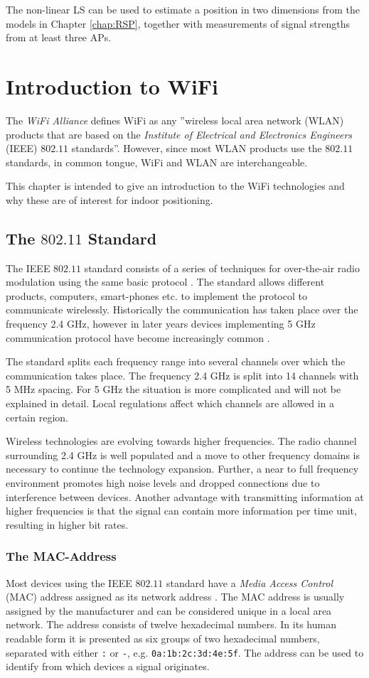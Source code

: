 \documentclass{LTHthesis}
\begin{document}
The non-linear LS can be used to estimate a position in two dimensions from the models in Chapter \ref{chap:RSP}, together with measurements of signal
 strengths from at least three APs. 
%
\chapter{Introduction to WiFi} %
\label{chap:wifi}
The \emph{WiFi Alliance} defines WiFi as any ''wireless local area network (WLAN) products that are based on the \emph{Institute of Electrical and Electronics Engineers} (IEEE) $802.11$ standards''. However, since most WLAN products use the $802.11$ standards, in common tongue, WiFi and WLAN are interchangeable.    

This chapter is intended to give an introduction to the WiFi technologies and why these are of interest for indoor positioning.
%
\section{The $802.11$ Standard}
%
The IEEE $802.11$ standard consists of a series of techniques for over-the-air radio modulation using the same basic protocol \cite{IEEE:802.11}. The standard allows different products, computers, smart-phones etc. to implement the protocol to communicate wirelessly. Historically the communication has taken place over the frequency 2.4 GHz, however in later years devices implementing 5 GHz communication protocol have become increasingly common \cite{walrand10}.

The standard splits each frequency range into several channels over which the communication takes place. The frequency 2.4 GHz is split into 14 channels with 5 MHz spacing. For 5 GHz the situation is more complicated and will not be explained in detail. Local regulations affect which channels are allowed in a certain region.   

Wireless technologies are evolving towards higher frequencies. The radio channel  surrounding 2.4 GHz is well populated and a move to other frequency domains is necessary to continue the technology expansion. Further, a near to full frequency environment promotes high noise levels and dropped connections due to interference between devices. Another advantage with transmitting information at higher frequencies is that the signal can contain more information per time unit, resulting in higher bit rates.    
%
\subsection{The MAC-Address}
%
Most devices using the IEEE $802.11$ standard have a \emph{Media Access Control} (MAC) address assigned as its network address \cite{IEEE:802.11}. The MAC address is usually assigned by the manufacturer and can be considered unique in a local area network. The address consists of twelve hexadecimal numbers. In its human readable form it is presented as six groups of two hexadecimal numbers, separated with either \verb|:| or \verb|-|, e.g. \verb|0a:1b:2c:3d:4e:5f|. The address can be used to identify from which devices a signal originates.
%
\end{document}
